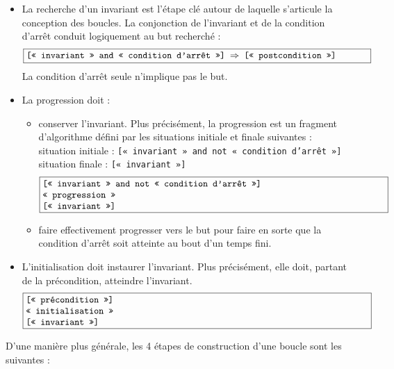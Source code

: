 \begin{itemize}
\item La recherche d'un invariant est l'étape clé autour de laquelle s'articule la conception des boucles. 
	La conjonction de l'invariant et de la condition d'arrêt conduit logiquement au but recherché :
	$$\fbox{\begin{minipage}{13cm}\tt
	[« invariant » and « condition d'arrêt »] $\Rightarrow$ [« postcondition »]
	\end{minipage}}$$
	La condition d'arrêt seule n'implique pas le but.

\item La progression doit :
	\begin{itemize}
	\item conserver l'invariant.
		Plus précisément, la progression est un fragment d'algorithme
		défini par les situations initiale et finale suivantes :\\
		\mbox{}\hspace*{5mm}situation initiale : {\tt [« invariant » and not « condition d'arrêt »]}\\
		\mbox{}\hspace*{5mm}situation finale : {\tt [« invariant »]}\\ 
		$$\fbox{\begin{minipage}{13cm}\tt
		\mbox{}[« invariant » and not « condition d'arrêt »]\\
		\mbox{}« progression »\\
		\mbox{}[« invariant »]
		\end{minipage}}$$
	\item faire effectivement progresser vers le but pour faire en sorte que la condition 
		d'arrêt soit atteinte au bout d'un temps fini.
	\end{itemize}
\item  L'initialisation doit instaurer l'invariant. 
	Plus précisément, elle doit, partant de la précondi\-tion, atteindre l'invariant.
		$$\fbox{\begin{minipage}{13cm}\tt
		\mbox{}[« précondition »]\\
		\mbox{}« initialisation »\\
		\mbox{}[« invariant »]
		\end{minipage}}$$

\end{itemize}
D'une manière plus générale, les 4 étapes de construction d'une boucle
sont les suivantes :
